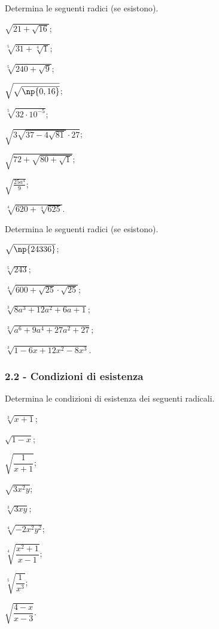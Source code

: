 \begin{esercizio}[\Ast]
\label{ese:2.9}
Determina le seguenti radici (se esistono).
 \begin{multicols}{3}
 \begin{enumeratea}
 \item $\sqrt{21+\sqrt{16}}$;
 \item $\sqrt[5]{31+\sqrt[4]1}$;
 \item $\sqrt[5]{240+\sqrt 9}$;
 \item $\sqrt{\sqrt{\np{0,16}}}$;
 \item $\sqrt[5]{32\cdot 10^{-5}}$;
 \item $\sqrt{3\sqrt{37-4\sqrt{81}}\cdot 27}$;
 \item $\sqrt{72+\sqrt{80+\sqrt 1}}$;
 \item $\sqrt{\frac{25a^4} 9}$;
 \item $\sqrt[4]{620+\sqrt[4]{625}}$.
 \end{enumeratea}
 \end{multicols}
\end{esercizio}

\begin{esercizio}[\Ast]
 \label{ese:2.10}
Determina le seguenti radici (se esistono).
 \begin{multicols}{3}
 \begin{enumeratea}
 \item $\sqrt{\np{24336}}$;
 \item $\sqrt[5]{243}$;
 \item $\sqrt[4]{600+\sqrt{25}\cdot \sqrt{25}}$;
 \item $\sqrt[3]{8a^3+12a^2+6a+1}$;
 \item $\sqrt[3]{a^6+9a^4+27a^2+27}$;
 \item $\sqrt[3]{1-6x+12x^2-8x^3}$.
 \end{enumeratea}
 \end{multicols}
\end{esercizio}

\subsubsection*{2.2 - Condizioni di esistenza}

\begin{esercizio}[\Ast]
 \label{ese:2.11}
Determina le condizioni di esistenza dei seguenti radicali.
 \begin{multicols}{3}
 \begin{enumeratea}
 \item $\sqrt[3]{x+1}$;
 \item $\sqrt{1-x}$;
 \item $\sqrt{\dfrac 1{x+1}}$;
 \item $\sqrt{3x^2y}$;
 \item $\sqrt[3]{3xy}$;
 \item $\sqrt[4]{-2x^2y^2}$;
 \item $\sqrt[4]{\dfrac{x^2+1}{x-1}}$;
 \item $\sqrt[5]{\dfrac 1{x^3}}$;
 \item $\sqrt{\dfrac{4-x}{x-3}}$.
 \end{enumeratea}
 \end{multicols}
\end{esercizio}

